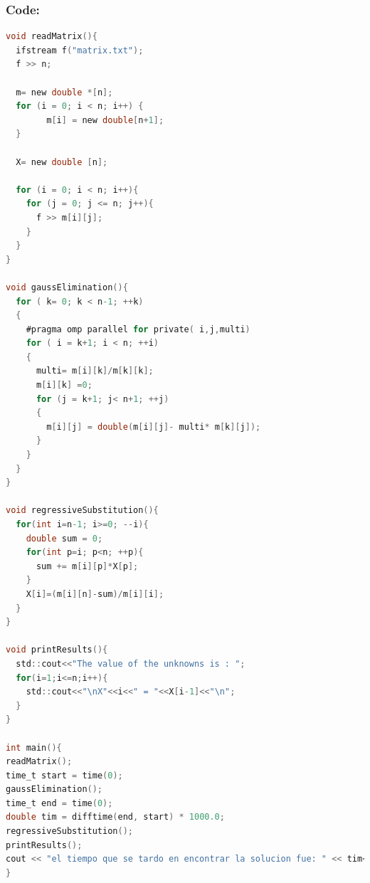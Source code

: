 \documentclass{article}
\newcounter{subsubsubsection}[subsubsection]
\begin{document}
\subsubsection{Code:}


\begin{lstlisting}[language=C]
void readMatrix(){
  ifstream f("matrix.txt");
  f >> n;

  m= new double *[n];
  for (i = 0; i < n; i++) {
        m[i] = new double[n+1];
  }

  X= new double [n];

  for (i = 0; i < n; i++){
    for (j = 0; j <= n; j++){
      f >> m[i][j];
    }
  }
}

void gaussElimination(){
  for ( k= 0; k < n-1; ++k)
  {
    #pragma omp parallel for private( i,j,multi)
    for ( i = k+1; i < n; ++i)
    {
      multi= m[i][k]/m[k][k];
      m[i][k] =0;
      for (j = k+1; j< n+1; ++j)
      {
        m[i][j] = double(m[i][j]- multi* m[k][j]);
      }
    }
  }
}

void regressiveSubstitution(){
  for(int i=n-1; i>=0; --i){
    double sum = 0;
    for(int p=i; p<n; ++p){
      sum += m[i][p]*X[p];
    }
    X[i]=(m[i][n]-sum)/m[i][i];
  }  
}

void printResults(){
  std::cout<<"The value of the unknowns is : ";
  for(i=1;i<=n;i++){
    std::cout<<"\nX"<<i<<" = "<<X[i-1]<<"\n";
  }
}

int main(){
readMatrix();
time_t start = time(0);
gaussElimination();
time_t end = time(0);
double tim = difftime(end, start) * 1000.0;
regressiveSubstitution();
printResults();
cout << "el tiempo que se tardo en encontrar la solucion fue: " << tim<<endl;
}
\end{lstlisting}

\end{document}
